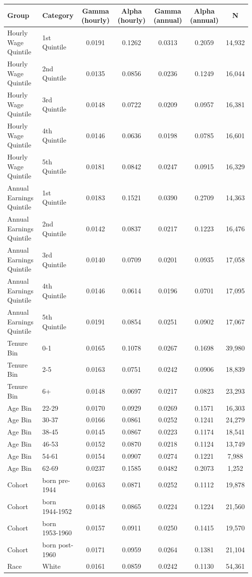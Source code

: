 \begin{tabular}{llccccc}
\hline\hline
Group & Category & Gamma (hourly) & Alpha (hourly) & Gamma (annual) & Alpha (annual) & N \\
\hline
Hourly Wage Quintile&1st Quintile&0.0191&0.1262&0.0313&0.2059&14,932\\
Hourly Wage Quintile&2nd Quintile&0.0135&0.0856&0.0236&0.1249&16,044\\
Hourly Wage Quintile&3rd Quintile&0.0148&0.0722&0.0209&0.0957&16,381\\
Hourly Wage Quintile&4th Quintile&0.0146&0.0636&0.0198&0.0785&16,601\\
Hourly Wage Quintile&5th Quintile&0.0181&0.0842&0.0247&0.0915&16,329\\
Annual Earnings Quintile&1st Quintile&0.0183&0.1521&0.0390&0.2709&14,363\\
Annual Earnings Quintile&2nd Quintile&0.0142&0.0837&0.0217&0.1223&16,476\\
Annual Earnings Quintile&3rd Quintile&0.0140&0.0709&0.0201&0.0935&17,058\\
Annual Earnings Quintile&4th Quintile&0.0146&0.0614&0.0196&0.0701&17,095\\
Annual Earnings Quintile&5th Quintile&0.0191&0.0854&0.0251&0.0902&17,067\\
Tenure Bin&0-1&0.0165&0.1078&0.0267&0.1698&39,980\\
Tenure Bin&2-5&0.0163&0.0751&0.0242&0.0906&18,839\\
Tenure Bin&6+&0.0148&0.0697&0.0217&0.0823&23,293\\
Age Bin&22-29&0.0170&0.0929&0.0269&0.1571&16,303\\
Age Bin&30-37&0.0166&0.0861&0.0252&0.1241&24,279\\
Age Bin&38-45&0.0145&0.0867&0.0223&0.1174&18,541\\
Age Bin&46-53&0.0152&0.0870&0.0218&0.1124&13,749\\
Age Bin&54-61&0.0154&0.0907&0.0274&0.1221&7,988\\
Age Bin&62-69&0.0237&0.1585&0.0482&0.2073&1,252\\
Cohort&born pre-1944&0.0163&0.0871&0.0252&0.1112&19,878\\
Cohort&born 1944-1952&0.0148&0.0865&0.0224&0.1224&21,560\\
Cohort&born 1953-1960&0.0157&0.0911&0.0250&0.1415&19,570\\
Cohort&born post-1960&0.0171&0.0959&0.0264&0.1381&21,104\\
Race&White&0.0161&0.0859&0.0242&0.1130&54,361\\

\end{tabular}
